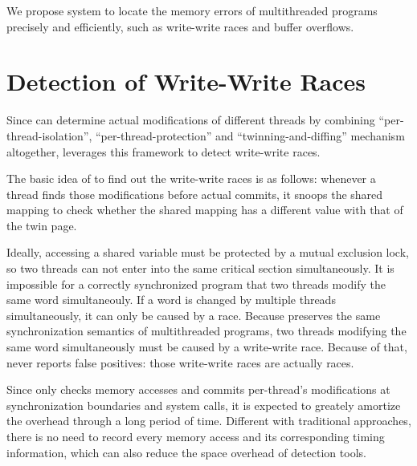 We propose \DoubleTake{} system to locate the memory errors of 
multithreaded programs precisely and efficiently, such as write-write races and buffer overflows. 

\section{Detection of Write-Write Races}

Since \Sheriff{} can determine actual 
modifications of different threads by combining
``per-thread-isolation'', ``per-thread-protection'' and ``twinning-and-diffing'' mechanism
altogether, \DoubleTake{} leverages this framework to detect write-write races.
 
The basic idea of \DoubleTake{} to find out the write-write races is as follows: 
whenever a thread finds those modifications before actual commits, 
it snoops the shared mapping to check whether the shared mapping has a different value 
with that of the twin page.

Ideally, accessing a shared variable must be protected by a mutual exclusion lock, 
so two threads can not enter into the same critical section simultaneously.
It is impossible for a correctly synchronized program that two threads modify 
the same word simultaneouly.  
If a word is changed by multiple threads simultaneously, it can only be caused by a race.
Because \DoubleTake{} preserves the same synchronization semantics of multithreaded programs, 
two threads modifying the same word simultaneously must be caused by a write-write race.
Because of that, \DoubleTake{}  never reports false 
positives: those write-write races are actually races. 

Since \DoubleTake{} only checks memory accesses and commits per-thread's modifications 
at synchronization 
boundaries and system calls, it is expected to greately amortize the overhead 
through a long period of time. 
Different with traditional approaches, there is no need to record every memory access and its 
corresponding timing information, which can also reduce the space overhead of detection tools. 

